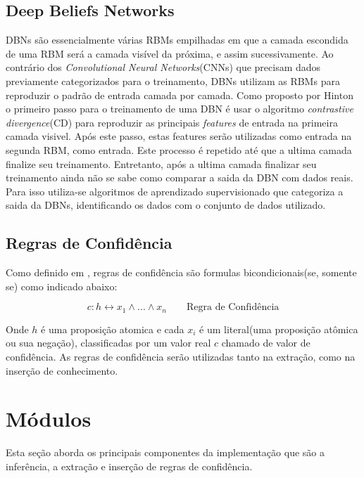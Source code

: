 \documentclass[a4paper, 12pt]{article}
\begin{document}
    \subsection{Deep Beliefs Networks}
    DBNs são essencialmente várias RBMs empilhadas em que a camada escondida de uma RBM será a camada visível da próxima, e assim sucessivamente. Ao contrário dos \textit{Convolutional Neural Networks}(CNNs) que precisam dados previamente categorizados para o treinamento, DBNs utilizam as RBMs para reproduzir o padrão de entrada camada por camada. Como proposto por Hinton\cite{Hinton} o primeiro passo para o treinamento de uma DBN é usar o algoritmo \textit{contrastive divergence}(CD) para reproduzir as principais \textit{features} de entrada na primeira camada visivel. Após este passo, estas features serão utilizadas como entrada na segunda RBM, como entrada. Este processo é repetido até que a ultima camada finalize seu treinamento. Entretanto, após a ultima camada finalizar seu treinamento ainda não se sabe como comparar a saida da DBN com dados reais. Para isso utiliza-se algoritmos de aprendizado supervisionado que categoriza a saida da DBNs, identificando os dados com o conjunto de dados utilizado.  
    
    \subsection{Regras de Confidência}
    Como definido em \cite{Tran}, regras de confidência são formulas bicondicionais(se, somente se) como indicado abaixo:
    
    \begin{equation}
    c : h \leftrightarrow x_1 \wedge ... \wedge x_n
    \qquad \text{Regra de Confidência}
    \end{equation}
    
    Onde $h$ é uma proposição atomica e cada $x_i$ é um literal(uma proposição atômica ou sua negação), classificadas por um valor real $c$ chamado de valor de confidência. As regras de confidência serão utilizadas tanto na extração, como na inserção de conhecimento.
        
    \section{Módulos}
    
    Esta seção aborda os principais componentes da implementação que são a inferência, a extração e inserção de regras de confidência.
\end{document}
